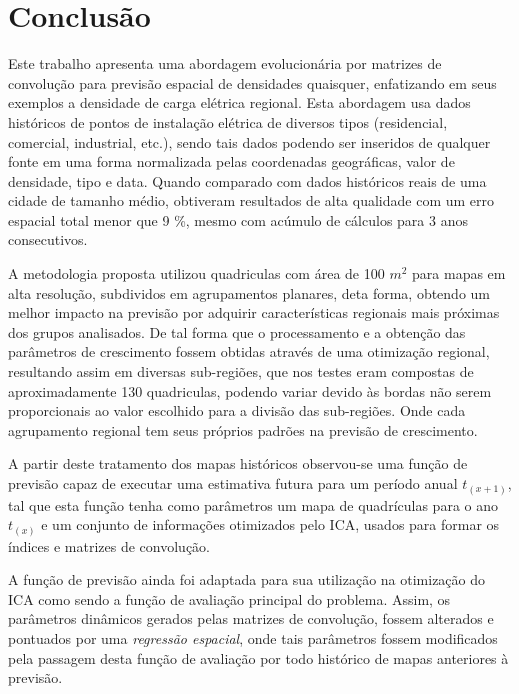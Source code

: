 \chapter{Conclusão}
\label{conclusao}

Este trabalho apresenta uma abordagem evolucionária por matrizes de convolução para previsão espacial de densidades quaisquer, enfatizando em seus exemplos a densidade de carga elétrica regional. Esta abordagem usa dados históricos de pontos de instalação elétrica de diversos tipos (residencial, comercial, industrial, etc.), sendo tais dados podendo ser inseridos de qualquer fonte em uma forma normalizada pelas coordenadas geográficas, valor de densidade, tipo e  data. Quando comparado com dados históricos reais de uma cidade de tamanho médio, obtiveram resultados de alta qualidade com um erro espacial total menor que 9 \%, mesmo com acúmulo de cálculos para 3 anos consecutivos. 

A metodologia proposta utilizou quadriculas com área de 100 \(m^2\) para mapas em alta resolução, subdividos em agrupamentos planares, deta forma, obtendo um melhor impacto na previsão por adquirir características regionais mais próximas dos grupos analisados. De tal forma que o processamento e a obtenção das parâmetros de crescimento fossem obtidas através de uma otimização regional, resultando assim em diversas sub-regiões, que nos testes eram compostas de aproximadamente 130 quadriculas, podendo variar devido às bordas não serem proporcionais ao valor escolhido para a divisão das sub-regiões. Onde cada agrupamento regional tem seus próprios padrões na previsão de crescimento.

A partir deste tratamento dos mapas históricos observou-se uma função de previsão capaz de executar uma estimativa futura para um período anual \(t_{(x+1)}\), tal que esta função tenha como parâmetros um mapa de quadrículas para o ano \(t_{(x)}\) e um conjunto de informações otimizados pelo ICA, usados para formar os índices e matrizes de convolução.  

A função de previsão ainda foi adaptada para sua utilização na otimização do ICA como sendo a função de avaliação principal do problema. Assim, os parâmetros dinâmicos gerados pelas matrizes de convolução, fossem alterados e pontuados por uma \emph{regressão espacial}, onde tais parâmetros fossem modificados pela passagem desta função de avaliação por todo histórico de mapas anteriores à previsão. 

